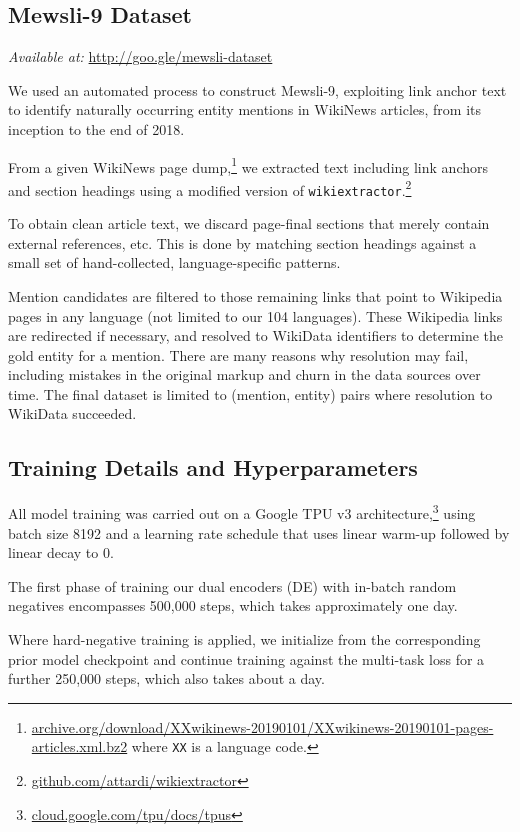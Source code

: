 \documentclass[11pt,a4paper]{article}
\begin{document}
\subsection{Mewsli-9 Dataset}\label{appsec:mewsli}
\emph{Available at:} \url{http://goo.gle/mewsli-dataset}

We used an automated process to construct Mewsli-9, exploiting link anchor text to identify naturally occurring entity mentions in WikiNews articles, from its inception to the end of 2018.

From a given WikiNews page dump,\footnote{\url{archive.org/download/XXwikinews-20190101/XXwikinews-20190101-pages-articles.xml.bz2}
where \texttt{XX} is a language code.
}
we extracted text including link anchors and section headings using a modified version of \texttt{\small wikiextractor}.\footnote{\url{github.com/attardi/wikiextractor}}

To obtain clean article text, we discard page-final sections that merely contain external references, etc.
This is done by matching section headings against a small set of hand-collected, language-specific patterns.

Mention candidates are filtered to those remaining links that point to Wikipedia pages in any language (not limited to our 104 languages).
These Wikipedia links are redirected if necessary, and resolved to WikiData identifiers to determine the gold entity for a mention.
There are many reasons why resolution may fail, including mistakes in the original markup and churn in the data sources over time.
The final dataset is limited to (mention, entity) pairs where resolution to WikiData succeeded.

\subsection{Training Details and Hyperparameters}\label{appsec:training}
All model training was carried out on a Google TPU v3 architecture,\footnote{\url{cloud.google.com/tpu/docs/tpus}} using batch size 8192 and
a learning rate schedule that uses linear warm-up followed by linear decay to 0.

The first phase of training our dual encoders (DE) with in-batch random negatives encompasses 500,000 steps, which takes approximately one day.

Where hard-negative training is applied, we initialize from the corresponding prior model checkpoint
and continue training against the multi-task loss for a further 250,000 steps, which also takes about a day.
\end{document}
